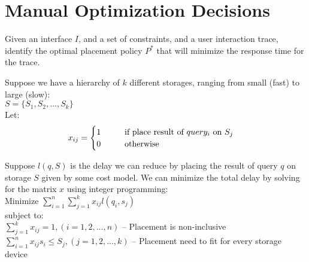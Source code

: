


\section*{Manual Optimization Decisions}

\begin{problem}
  Given an interface $I$, and a set of constraints, and a user interaction trace, identify the optimal placement policy $P^*$ that will minimize the response time for the trace.
\end{problem}

Suppose we have a hierarchy of $k$ different storages, ranging from small (fast) to large (slow):\\

\hspace{10mm} $S=\{S_1, S_2, ..., S_k\}$\\

Let:
\begin{equation}
	x_{ij}=
	\begin{cases}
		1 \hspace{10mm} \text{if place result of $query_i$ on $S_j$} \\
		0 \hspace{10mm} \text{otherwise}
	\end{cases}
\end{equation}

Suppose $l(q, S)$ is the delay we can reduce by placing the result of query $q$ on storage $S$ given by some cost model. We can minimize the total delay by solving for the matrix $x$ using integer programming:\\

\hspace{10mm} Minimize $\sum_{i=1}^{n} \sum_{j=1}^{k} x_{ij} l(q_i, s_j)$\\

subject to:\\

\hspace{10mm} $\sum_{j=1}^{k} x_{ij} = 1, (i=1,2,...,n)$ \hspace{10mm} -- Placement is non-inclusive\\

\hspace{10mm} $\sum_{i=1}^{n} x_{ij} s_i \le S_j, (j=1,2,...,k)$ \hspace{10mm} -- Placement need to fit for every storage device\\
  
